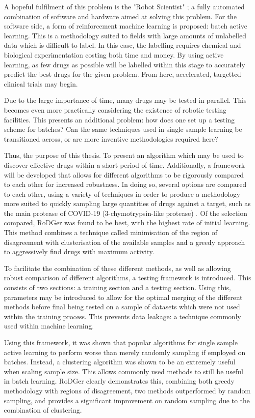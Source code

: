 A hopeful fulfilment of this problem is the "Robot Scientist" \cite{And10}; a fully automated combination of software and hardware aimed at solving this problem. For the software side, a form of reinforcement machine learning is proposed: batch active learning. This is a methodology suited to fields with large amounts of unlabelled data which is difficult to label. In this case, the labelling requires chemical and biological experimentation costing both time and money. By using active learning, as few drugs as possible will be labelled within this stage to accurately predict the best drugs for the given problem. From here, accelerated, targetted clinical trials may begin.

Due to the large importance of time, many drugs may be tested in parallel. This becomes even more practically considering the existence of robotic testing facilities. This presents an additional problem: how does one set up a testing scheme for batches? Can the same techniques used in single sample learning be transitioned across, or are more inventive methodologies required here?

Thus, the purpose of this thesis. To present an algorithm which may be used to discover effective drugs within a short period of time. Additionally, a framework will be developed that allows for different algorithms to be rigorously compared to each other for increased robustness. In doing so, several options are compared to each other, using a variety of techniques in order to produce a methodology more suited to quickly sampling large quantities of drugs against a target, such as the main protease of \mbox{COVID-19} (3-chymotrypsin-like protease) \cite{prot20}. Of the selection compared, RoDGer was found to be best, with the highest rate of initial learning. This method combines a technique called minimisation of the region of disagreement with clusterisation of the available samples and a greedy approach to aggressively find drugs with maximum activity.

To facilitate the combination of these different methods, as well as allowing robust comparison of different algorithms, a testing framework is introduced. This consists of two sections: a training section and a testing section. Using this, parameters may be introduced to allow for the optimal merging of the different methods before final being tested on a sample of datasets which were not used within the training process. This prevents data leakage: a technique commonly used within machine learning.

Using this framework, it was shown that popular algorithms for single sample active learning to perform worse than merely randomly sampling if employed on batches. Instead, a clustering algorithm was shown to be an extremely useful when scaling sample size. This allows commonly used methods to still be useful in batch learning. RoDGer clearly demonstrates this, combining both greedy methodology with regions of disagreement, two methods outperformed by random sampling, and provides a significant improvement on random sampling due to the combination of clustering.